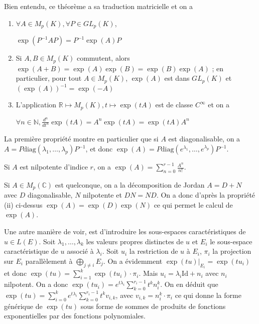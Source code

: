 Bien entendu, ce théorème a sa traduction matricielle et on a

\begin{thm}
\begin{enumerate}
\item $\forall A \in M_p(K), \forall P \in GL_p(K)$,

$\exp(P^{-1} A P) = P^{-1} \exp(A) P$

\item Si $A,B \in M_p(K)$ commutent, alors $\exp(A+B) = \exp(A) \exp(B) = \exp(B) \exp(A)$ ; en particulier, pour tout $A \in M_p(K)$, $\exp(A)$ est dans $GL_p(K)$ et $(\exp(A))^{-1} = \exp(-A)$

\item L'application $\mathbb{R} \mapsto M_p(K), t \mapsto \exp(tA)$ est de classe $C^{\infty}$ et on a

$\forall n \in \mathbb{N}, \frac{d^n}{dt^n} \exp(tA) = A^n \exp(tA) = \exp(tA) A^n$
\end{enumerate}
\end{thm}

La première propriété montre en particulier que si $A$ est diagonalisable, on a $A = P \mathrm{diag}(\lambda_1,\ldots,\lambda_p) P^{-1}$, et donc $\exp(A) = P \mathrm{diag}(e^{\lambda_1},\ldots,e^{\lambda_p}) P^{-1}$.

Si $A$ est nilpotente d'indice $r$, on a $\exp(A) = \sum_{n=0}^{r-1} \frac{A^n}{n!}$.

Si $A \in M_p(\mathbb{C})$ est quelconque, on a la décomposition de Jordan $A = D + N$ avec $D$ diagonalisable, $N$ nilpotente et $DN = ND$. On a donc d'après la propriété (ii) ci-dessus $\exp(A) = \exp(D) \exp(N)$ ce qui permet le calcul de $\exp(A)$.

Une autre manière de voir, est d'introduire les sous-espaces caractéristiques de $u \in L(E)$. Soit $\lambda_1,\ldots,\lambda_k$ les valeurs propres distinctes de $u$ et $E_i$ le sous-espace caractéristique de $u$ associé à $\lambda_i$. Soit $u_i$ la restriction de $u$ à $E_i$, $\pi_i$ la projection sur $E_i$ parallèlement à $\bigoplus_{j \neq i} E_j$. On a évidemment $\exp(tu)|_{E_i} = \exp(tu_i)$ et donc $\exp(tu) = \sum_{i=1}^k \exp(tu_i) \cdot \pi_i$. Mais $u_i = \lambda_i \mathrm{Id} + n_i$ avec $n_i$ nilpotent. On a donc $\exp(tu_i) = e^{t\lambda_i} \sum_{k=0}^{r_i-1} t^k n_i^k$. On en déduit que $\exp(tu) = \sum_{i=0}^k e^{t\lambda_i} \sum_{k=0}^{r_i-1} t^k v_{i,k}$, avec $v_{i,k} = n_i^k \cdot \pi_i$ ce qui donne la forme générique de $\exp(tu)$ sous forme de sommes de produits de fonctions exponentielles par des fonctions polynomiales.

